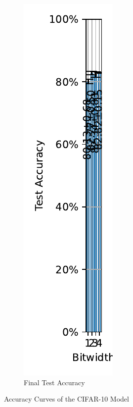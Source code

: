 \begin{figure}[H]
\begin{subfigure}[H]{0.3\textwidth}
                \centering
                \includegraphics[width=\textwidth]{../standard/CIFAR10/plots/cifar10_final_acc.pdf}
                \caption{Final Test Accuracy}
            \end{subfigure}
            \caption{Accuracy Curves of the CIFAR-10 Model}
        \end{figure}

